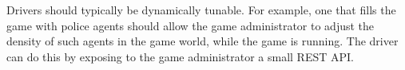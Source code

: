 
Drivers should typically be dynamically tunable.
For example, one that fills the game with police agents should allow the game
administrator to adjust the density of such agents in the game world, while
the game is running.
The driver can do this by exposing to the game
administrator a small REST API\@.
